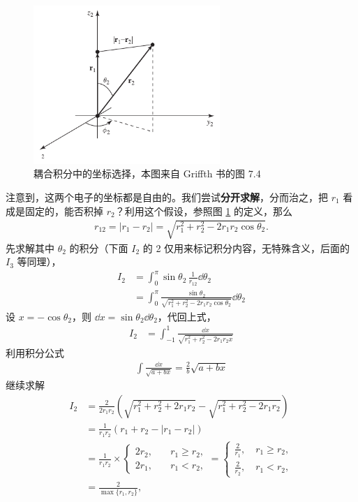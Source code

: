 \begin{figure}\centering
    \includegraphics[height=6cm]{fig/r2_integral.pdf}
    \caption{耦合积分中的坐标选择，本图来自 Griffth 书的图 7.4}
    \label{fig:coupled_r2}
\end{figure}
注意到，这两个电子的坐标都是自由的。我们尝试\textbf{分开求解}，分而治之，把 $r_1$ 看成是固定的，能否积掉 $r_2$？利用这个假设，参照图 \ref{fig:coupled_r2} 的定义，那么
\begin{align}
    r_12 = |r_1 - r_2| = \sqrt{r_1^2 + r_2^2 - 2r_1 r_2 \cos\theta_2}. 
\end{align}
先求解其中 $\theta_2$ 的积分（下面 $I_2$ 的 2 仅用来标记积分内容，无特殊含义，后面的 $I_3$ 等同理），
\begin{align}
    I_2&=\int_0^\pi \sin\theta_2 \, \frac1{r_{12}} \dd\theta_2 \\
    &=\int_0^\pi \frac{\sin\theta_2}{\sqrt{r_1^2 + r_2^2 - 2r_1 r_2 \cos\theta_2}}\dd\theta_2
\end{align}
设 $x = -\cos\theta_2$，则 $\dd x = \sin\theta_2\dd\theta_2$，代回上式，
\begin{align}
    I_2 &= \int_{-1}^1 \frac{\dd x}{\sqrt{r_1^2 + r_2^2 - 2r_1 r_2 x }}
\end{align}
利用积分公式
\begin{align}
    \int \frac{\dd x}{\sqrt{a+bx}} = \frac2b \sqrt{a+bx}
\end{align}
继续求解
\begin{align}
    I_2&= \frac{2}{2r_1r_2} \left(
        \sqrt{r_1^2 + r_2^2 + 2r_1r_2} - \sqrt{r_1^2+r_2^2 - 2r_1r_2}
    \right) \\
    &= \frac1{r_1r_2} \left(
        r_1 + r_2 - |r_1 - r_2|
    \right)\\
    &= \frac1{r_1r_2} \times \begin{cases}
        2r_2, \quad & r_1 \geqslant r_2, \\
        2r_1, \quad & r_1 < r_2,
    \end{cases} 
    = \begin{cases}
        \frac{2}{r_1}, \quad r_1 \geqslant r_2, \\
        \frac{2}{r_2}, \quad r_1 < r_2, 
    \end{cases}
    \\
    &= \frac2{\max\{r_1, r_2\}},
\end{align}
